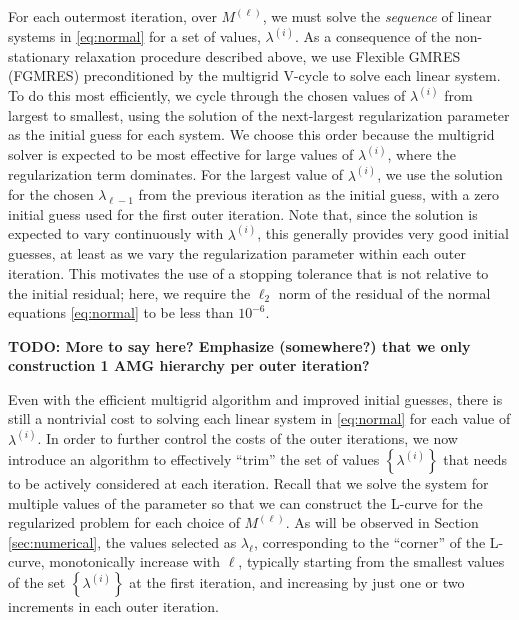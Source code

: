 
For each outermost iteration, over $M^{(\ell)}$, we must solve the
\textit{sequence} of linear systems in \eqref{eq:normal} for a set of
values, $\lambda^{(i)}$.  As a consequence of the non-stationary
relaxation procedure described above, we use Flexible GMRES
(FGMRES) \cite{YSaad_2003a} preconditioned by the multigrid V-cycle to
solve each linear system.  To do this most efficiently, we cycle
through the chosen values of $\lambda^{(i)}$ from largest to smallest,
using the solution of the next-largest regularization parameter as the
initial guess for each system.  We choose this order because the
multigrid solver is expected to be most effective for large values of
$\lambda^{(i)}$, where the regularization term dominates.  For the
largest value of $\lambda^{(i)}$, we use the solution for the chosen
$\lambda_{\ell-1}$ from the previous iteration as the initial guess,
with a zero initial guess used for the first outer iteration.  Note
that, since the solution is expected to vary continuously with
$\lambda^{(i)}$, this generally provides very good initial guesses, at
least as we vary the regularization parameter within each outer
iteration.  This motivates the use of a stopping tolerance that is not
relative to the initial residual; here, we require the $\ell_2$ norm
of the residual of the normal equations \eqref{eq:normal} to be less than $10^{-6}$.

{\bf TODO: More to say here? Emphasize (somewhere?) that we only
  construction 1 AMG hierarchy per outer iteration?}

Even with the efficient multigrid algorithm and improved initial
guesses, there is still a nontrivial cost to solving each linear
system in \eqref{eq:normal} for each value of $\lambda^{(i)}$.  In
order to further control the costs of the outer iterations, we now
introduce an algorithm to effectively ``trim'' the set of values
$\left\{\lambda^{(i)}\right\}$ that needs to be actively considered at
each iteration.  Recall that we solve the system for multiple values
of the parameter so that we can construct the L-curve for the
regularized problem for each choice of $M^{(\ell)}$.  As will be
observed in Section \ref{sec:numerical}, the values selected as
$\lambda_\ell$, corresponding to the ``corner'' of the L-curve,
monotonically increase with $\ell$, typically starting from the
smallest values of the set $\left\{\lambda^{(i)}\right\}$ at the first
iteration, and increasing by just one or two increments in each outer
iteration.

